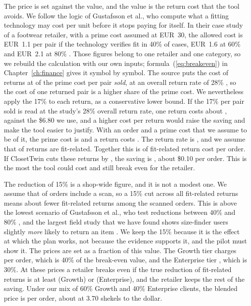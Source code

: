 The price is set against the value, and the value is the return cost that the tool avoids. We follow the logic of Gustafsson et al., who compute what a fitting technology may cost per unit before it stops paying for itself. In their case study of a footwear retailer, with a prime cost assumed at EUR~30, the allowed cost is EUR~1.1 per pair if the technology verifies fit in 40\% of cases, EUR~1.6 at 60\% and EUR~2.1 at 80\% \cite{gustafsson2021}. Those figures belong to one retailer and one category, so we rebuild the calculation with our own inputs; formula~(\ref{eq:breakeven}) in Chapter~\ref{ch:finance} gives it symbol by symbol. The source puts the cost of returns at  of the prime cost per pair \emph{sold}, at an overall return rate of 28\% \cite{gustafsson2021}, so the cost of one returned pair is a higher share of the prime cost. We nevertheless apply the 17\% to each return, as a conservative lower bound. If the 17\% per pair sold is read at the study's 28\% overall return rate, one return costs about , against the \$6.80 we use, and a higher cost per return would raise the saving and make the tool easier to justify. With an  order and a prime cost that we assume to be  of it, the prime cost is  and a return costs . The return rate is  \cite{coresight2023}, and we assume that  of returns are fit-related. Together this is  of fit-related return cost per order. If ClosetTwin cuts these returns by , the saving is , about \$0.10 per order. This is the most the tool could cost and still break even for the retailer.

The reduction of 15\% is a shop-wide figure, and it is not a modest one. We assume that  of orders include a scan, so a 15\% cut across all fit-related returns means about  fewer fit-related returns among the scanned orders. This is above the lowest scenario of Gustafsson et al., who test reductions between 40\% and 80\% \cite{gustafsson2021}, and the largest field study that we have found shows size-finder users slightly \emph{more} likely to return an item \cite{patel2025}. We keep the 15\% because it is the effect at which the plan works, not because the evidence supports it, and the pilot must show it. The prices are set as a fraction of this value. The Growth tier charges  per order, which is 40\% of the break-even value, and the Enterprise tier , which is 30\%. At these prices a retailer breaks even if the true reduction of fit-related returns is at least  (Growth) or  (Enterprise), and the retailer keeps the rest of the saving. Under our mix of 60\% Growth and 40\% Enterprise clients, the blended price is  per order, about  at 3.70 shekels to the dollar.

